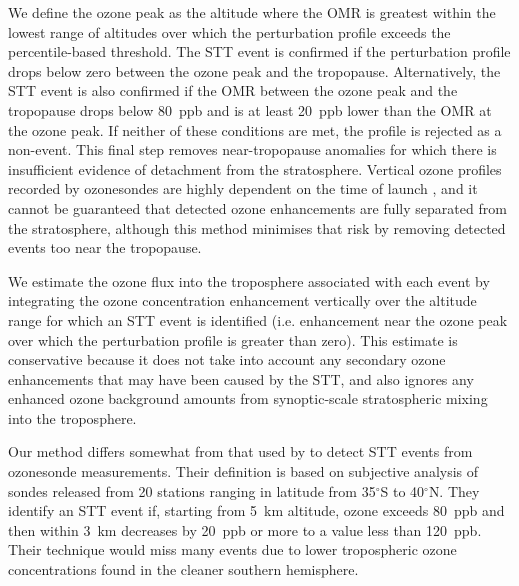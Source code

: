        
    We define the ozone peak as the altitude where the OMR is greatest within the lowest range of altitudes over which the perturbation profile exceeds the percentile-based threshold.
    The STT event is confirmed if the perturbation profile drops below zero between the ozone peak and the tropopause. 
    Alternatively, the STT event is also confirmed if the OMR between the ozone peak and the tropopause drops below 80~ppb and is at least 20~ppb lower than the OMR at the ozone peak. 
    If neither of these conditions are met, the profile is rejected as a non-event.
    This final step removes near-tropopause anomalies for which there is insufficient evidence of detachment from the stratosphere.
    Vertical ozone profiles recorded by ozonesondes are highly dependent on the time of launch \citep{Sprenger2003}, and it cannot be guaranteed that detected ozone enhancements are fully separated from the stratosphere, although this method minimises that risk by removing detected events too near the tropopause.

    We estimate the ozone flux into the troposphere associated with each event by integrating the ozone concentration enhancement vertically over the altitude range for which an STT event is identified (i.e. enhancement near the ozone peak over which the perturbation profile is greater than zero).
    This estimate is conservative because it does not take into account any secondary ozone enhancements that may have been caused by the STT, and also ignores any enhanced ozone background amounts from synoptic-scale stratospheric mixing into the troposphere.
    
    Our method differs somewhat from that used by \citet{Tang2010} to detect STT events from ozonesonde measurements. 
    Their definition is based on subjective analysis of sondes released from 20 stations ranging in latitude from 35$^\circ$S to 40$^\circ$N.
    They identify an STT event if, starting from 5~km altitude, ozone exceeds 80~ppb and then within 3~km decreases by 20~ppb or more to a value less than 120~ppb.
    Their technique would miss many events due to lower tropospheric ozone concentrations found in the cleaner southern hemisphere.

